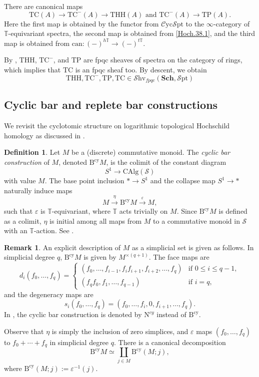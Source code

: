 \documentclass[11pt, a4paper]{amsart}
\theoremstyle{definition}
\newtheorem{df}[thm]{Definition}
\newtheorem{rmk}[thm]{Remark}
\numberwithin{equation}{subsection}
\newcommand{\T}{\mathbb{T}}
\newcommand{\Sch}{\mathbf{Sch}}
\newcommand{\THH}{\mathrm{THH}}
\newcommand{\TC}{\mathrm{TC}}
\newcommand{\TP}{\mathrm{TP}}
\newcommand{\Bcy}{\operatorname{B^{cy}}}
\renewcommand{\epsilon}{\varepsilon}
\newcommand{\infSpc}{\mathcal{S}}
\newcommand{\infShv}{\mathcal{S}\mathrm{hv}}
\newcommand{\infSpt}{\mathcal{S}\mathrm{pt}}
\newcommand{\infCycSpt}{\mathcal{C}\mathrm{yc}\mathcal{S}\mathrm{pt}}
\newcommand{\CAlg}{\mathrm{CAlg}}
\begin{document}
There are canonical maps
\[
\TC(A)\to \TC^{-}(A)\to \THH(A)
\text{ and }
\TC^-(A)\to \TP(A).
\]
Here the first map is obtained by the functor from $\infCycSpt$ to the $\infty$-category of $\mathbb{T}$-equivariant spectra, 
the second map is obtained from \eqref{Hoch.38.1},
and the third map is obtained from $\mathrm{can}\colon (-)^{h\mathbb{T}}\to (-)^{t\mathbb{T}}$.

By \cite[Corollary 3.4]{BMS19},
$\THH$, $\TC^-$, and $\TP$ are fpqc sheaves of spectra on the category of rings,
which implies that $\TC$ is an fpqc sheaf too.
By descent,
we obtain
\[
\THH,\TC^-,\TP,\TC\in \infShv_{fpqc}(\Sch,\infSpt)
\]




\subsection{Cyclic bar and replete bar constructions} We revisit the cyclotomic structure on logarithmic topological Hochschild homology as discussed in \cite{BLPO2}. 
\begin{df}
\label{Hoch.7}
Let $M$ be a (discrete) commutative monoid.
The \emph{cyclic bar construction} of $M$, 
denoted $\Bcy M$\index[notation]{Bcy @ $\Bcy M$}, 
is the colimit of the constant diagram
\[
S^1\to \CAlg(\infSpc)
\]
with value $M$.
The base point inclusion $*\to S^1$ and the collapse map $S^1\to *$ naturally induce maps
\begin{equation}
\label{Hoch.7.1}
M
\xrightarrow{\eta}
\Bcy M
\xrightarrow{\epsilon}
M,
\end{equation}
such that $\epsilon$ is $\T$-equivariant,
where $\mathbb{T}$ acts trivially on $M$.
Since $\Bcy M$ is defined as a colimit, 
$\eta$ is initial among all maps from $M$ to a commutative monoid in $\infSpc$ with an $\mathbb{T}$-action. See \cite[Proposition B.5]{NikolausScholze}.
\end{df}
\begin{rmk}
An explicit description of $M$ as a simplicial set is given as follows.
In simplicial degree $q$, $\Bcy M$ is given by $M^{\times (q+1)}$.
The face maps are
\[
d_i(f_0,\ldots,f_q)
=
\left\{
\begin{array}{ll}
(f_0,\ldots,f_{i-1},f_if_{i+1},f_{i+2},\ldots,f_q)&
\text{if }0\leq i\leq q-1,
\\
(f_qf_0,f_1,\ldots,f_{q-1})&
\text{if }i=q,
\end{array}
\right.
\]
and the degeneracy maps are
\[
s_i(f_0,\ldots,f_q)
=
(f_0,\ldots,f_i,0,f_{i+1},\ldots,f_q).
\]
In \cite[\S 2.3]{zbMATH03671343}, 
the cyclic bar construction is denoted by $\mathrm{N}^{cy}$ instead of $\Bcy$.

Observe that $\eta$ is simply the inclusion of zero simplices, 
and $\epsilon$ maps $(f_0,\ldots,f_q)$ to $f_0+\cdots +f_q$ in simplicial degree $q$.
There is a canonical decomposition
\begin{equation}
\label{Hoch.7.2}
\Bcy M
\simeq
\coprod_{j\in M}\Bcy (M;j),
\end{equation}
where $\Bcy (M;j) := \epsilon^{-1}(j)$.
\end{rmk}
\end{document}
